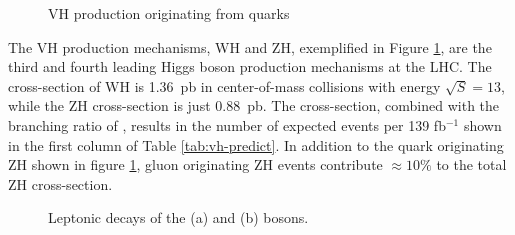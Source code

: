 \begin{figure}[htpb]
  \centering

  \caption{VH production originating from quarks}
    \label{fig:vh-prod}
\end{figure}

The VH production mechanisms, WH and ZH, exemplified in Figure \ref{fig:vh-prod}, are the third and fourth leading Higgs boson production mechanisms at the LHC.
The cross-section of WH is 1.36~pb in center-of-mass collisions with energy $\sqrt{S}=13$, while the ZH cross-section is just 0.88~pb.
The cross-section, combined with the branching ratio of \hmm, results in the number of expected events per 139 fb$^{-1}$ shown in the first column of Table \ref{tab:vh-predict}.
In addition to the quark originating ZH shown in figure \ref{fig:vh-prod}, gluon originating ZH events contribute $\approx10\%$ to the total ZH cross-section.

\begin{figure}[h!]
\captionsetup[subfigure]{position=b}
\centering
{}
\hspace{3em}
  \caption{Leptonic decays of the \W (a) and \Z (b) bosons.}
  \label{fig:vh-decay}
\end{figure}

